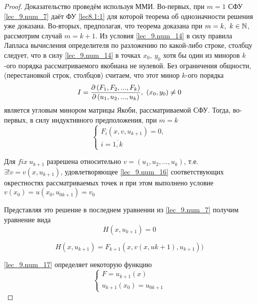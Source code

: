 \documentclass[../../main.tex]{subfiles}
\begin{document}
\begin{proof}
    Доказательство проведём используя ММИ.
    Во-первых, при $m = 1$ СФУ \eqref{lec_9.num_7} 
    даёт ФУ \eqref{lec8.1:1} для которой теорема об
    однозначности решения уже доказана.
    Во-вторых, предполагая, что теорема доказана
    при $m = k,\ k \in \mathbb{N}$, рассмотрим случай
    $m = k + 1$.
    Из условия \eqref{lec_9.num_14} в силу правила Лапласа
    вычисления определителя по разложению по какой-либо
    строке, столбцу следует, что в силу \eqref{lec_9.num_14} 
    в точках $x_0,\ y_0$ хотя бы один из миноров 
    $k$-ого порядка рассматриваемого якобиана не нулевой.
    Без ограничения общности,(перестановкой строк, столбцов)
    считаем, что этот минор $k$-ого порядка
    \begin{equation}
        \label{lec_9.num_15}
        I = \frac{\partial \left(F_1, F_2, ..., F_k\right)}{\partial \left(u_1, u_2, ..., u_k\right)},\ (x_0, y_0) \neq 0
    \end{equation}
    является угловым минором матрицы Якоби, рассматриваемой
    СФУ. Тогда, во-первых, в силу индуктивного
    предположения, при $m = k$
    \begin{equation}
        \label{lec_9.num_16}
        \begin{cases}
            F_i\left(x, v, u_{k+1}\right) = 0, \\
            i = \overline{1, k}
        \end{cases}
    \end{equation}
    
    Для $fix\ u_{k+1}$ разрешена относительно 
    $v = \left(u_1, u_2, ..., u_k\right)$, т.е. 
    $\exists!v = v\left(x, u_{k+1}\right)$, удовлетворяющее
    \eqref{lec_9.num_16} соответствующих окрестностях
    рассматриваемых точек и при этом выполнено условие\
    $v\left(x_0\right) = u\left(x_0, u_{0k+1}\right) = v_0$
    
    Представляя это решение в последнем уравнении из
    \eqref{lec_9.num_7} получим уравнение вида
    \begin{equation}
        \label{lec_9.num_17}
        H(x, u_{k+1}) = 0
    \end{equation}
    
    \begin{equation}
        \label{lec_9.num_18}
        H\left(x, u_{k+1}\right) = 
        F_{k+1}\left(x, v\left(x, u{k+1}\right), 
        u_{k+1}\right))
    \end{equation}
    
    \eqref{lec_9.num_17} определяет некоторую функцию
    \begin{equation}
        \label{lec_9.num_19}
        \begin{cases}
        F = u_{k+1}\left(x\right)\\
        u_{k+1}\left(x_0\right) = u_{0k+1}
        \end{cases}
    \end{equation}
    

\end{proof}
\end{document}
